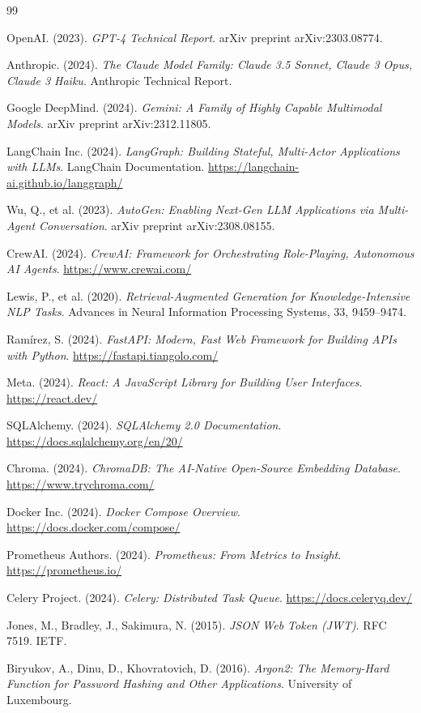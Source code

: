 \documentclass[12pt, a4paper]{report}
\begin{document}
\begin{thebibliography}{99}

OpenAI. (2023). \textit{GPT-4 Technical Report}. arXiv preprint arXiv:2303.08774.

Anthropic. (2024). \textit{The Claude Model Family: Claude 3.5 Sonnet, Claude 3 Opus, Claude 3 Haiku}. Anthropic Technical Report.

Google DeepMind. (2024). \textit{Gemini: A Family of Highly Capable Multimodal Models}. arXiv preprint arXiv:2312.11805.

LangChain Inc. (2024). \textit{LangGraph: Building Stateful, Multi-Actor Applications with LLMs}. LangChain Documentation. \url{https://langchain-ai.github.io/langgraph/}

Wu, Q., et al. (2023). \textit{AutoGen: Enabling Next-Gen LLM Applications via Multi-Agent Conversation}. arXiv preprint arXiv:2308.08155.

CrewAI. (2024). \textit{CrewAI: Framework for Orchestrating Role-Playing, Autonomous AI Agents}. \url{https://www.crewai.com/}

Lewis, P., et al. (2020). \textit{Retrieval-Augmented Generation for Knowledge-Intensive NLP Tasks}. Advances in Neural Information Processing Systems, 33, 9459--9474.

Ramírez, S. (2024). \textit{FastAPI: Modern, Fast Web Framework for Building APIs with Python}. \url{https://fastapi.tiangolo.com/}

Meta. (2024). \textit{React: A JavaScript Library for Building User Interfaces}. \url{https://react.dev/}

SQLAlchemy. (2024). \textit{SQLAlchemy 2.0 Documentation}. \url{https://docs.sqlalchemy.org/en/20/}

Chroma. (2024). \textit{ChromaDB: The AI-Native Open-Source Embedding Database}. \url{https://www.trychroma.com/}

Docker Inc. (2024). \textit{Docker Compose Overview}. \url{https://docs.docker.com/compose/}

Prometheus Authors. (2024). \textit{Prometheus: From Metrics to Insight}. \url{https://prometheus.io/}

Celery Project. (2024). \textit{Celery: Distributed Task Queue}. \url{https://docs.celeryq.dev/}

Jones, M., Bradley, J., Sakimura, N. (2015). \textit{JSON Web Token (JWT)}. RFC 7519. IETF.

Biryukov, A., Dinu, D., Khovratovich, D. (2016). \textit{Argon2: The Memory-Hard Function for Password Hashing and Other Applications}. University of Luxembourg.

\end{thebibliography}
\end{document}
